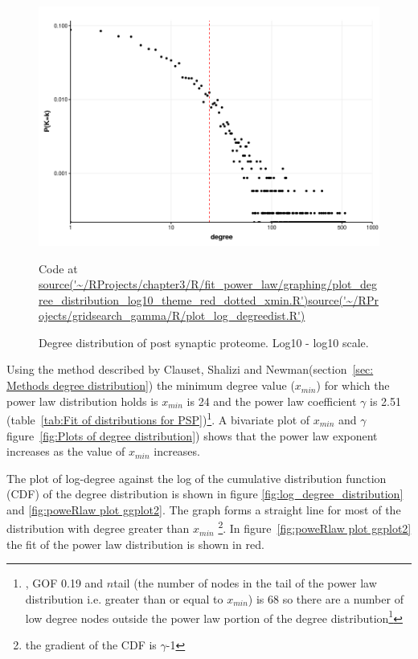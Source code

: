 \begin{figure}
    \includegraphics[width=12cm]{images/chapter3/poweRlaw/Rplot_degree_distribution_log10pktheme.png}
    \caption{Degree distribution of post synaptic proteome. Log10 - log10 scale.}
    \tiny Code at \url{source('~/RProjects/chapter3/R/fit_power_law/graphing/plot_degree_distribution_log10_theme_red_dotted_xmin.R')}\url{source('~/RProjects/gridsearch_gamma/R/plot_log_degreedist.R') }
    \label{fig:Degree distribution of post synaptic proteome. Log10 - log10 scale1}
\end{figure}


Using the method described by Clauset, Shalizi and Newman(section~\ref{sec: Methods degree distribution}) the minimum degree value ($x_{min}$) for which the power law distribution holds is $x_{min}$ is 24 and the power law coefficient $\gamma$ is 2.51 (table~\ref{tab:Fit of distributions for PSP})\footnote{, GOF 0.19 and  $n$tail (the number of nodes in the tail of the power law distribution i.e. greater than or equal to $x_{min}$) is 68 so there are a number of low degree  nodes outside the power law portion of the degree distribution\footnote{\url{source('~/RProjects/group_size_distribution/R/calulate_cdf.R')}}}. A bivariate plot of $x_{min}$ and $\gamma$ figure~\ref{fig:Plots of degree distribution}) shows that the power law exponent increases as the value of $x_{min}$ increases.

The plot of log-degree against the log of the cumulative distribution function (CDF) of the degree distribution is shown in figure \ref{fig:log_degree_distribution} and  \ref{fig:poweRlaw plot ggplot2}. The graph forms a straight line for most of the distribution with degree greater than $x_{min}$
\footnote{the gradient of the CDF is $\gamma$-1}. In figure~\ref{fig:poweRlaw plot ggplot2} the fit of the power law distribution is shown in red. 


